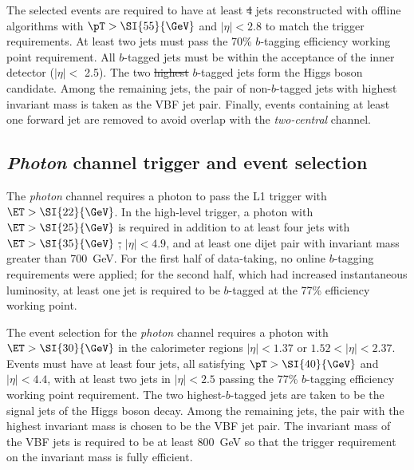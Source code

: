 \documentclass[PAPER, american,coverpage,texlive=2016, english]{\ATLASLATEXPATH atlasdoc}
\providecommand{\DIFadd}[1]{{\protect\color{blue}\uwave{#1}}} %
\providecommand{\DIFdel}[1]{{\protect\color{red}\sout{#1}}}                      %
\providecommand{\DIFaddbegin}{} %
\providecommand{\DIFaddend}{} %
\providecommand{\DIFdelbegin}{} %
\providecommand{\DIFdelend}{} %
\begin{document}
The selected events are required to have at least \DIFdelbegin \DIFdel{4 }\DIFdelend \DIFaddbegin \DIFadd{four }\DIFaddend jets reconstructed with offline algorithms with $\pT > \SI{55}{\GeV}$ and $|\eta|<2.8$ to match the trigger requirements.
At least two jets must pass the 70\% $b$-tagging efficiency working point requirement. 
All $b$-tagged jets must be within the acceptance of the inner detector ($|\eta| < $ 2.5).  The two \DIFdelbegin \DIFdel{highest }\DIFdelend \DIFaddbegin \DIFadd{highest-}\DIFaddend \pT $b$-tagged jets form the Higgs boson candidate.
Among the remaining jets, the pair of non-$b$-tagged jets with highest invariant mass is taken as the VBF jet pair.
Finally, events containing at least one forward jet \DIFaddbegin \DIFadd{with $\pT > 60~\GeV$ }\DIFaddend are removed to avoid overlap with the \textit{two-central} channel.

\subsection{\textit{Photon} channel trigger and event selection}

The \textit{photon} channel requires a photon to pass the L1 trigger with $\ET > \SI{22}{\GeV}$.
In the high-level trigger, a photon with $\ET > \SI{25}{\GeV}$ is required in addition to
 at least four jets with $\ET > \SI{35}{\GeV}$ \DIFdelbegin \DIFdel{, }\DIFdelend \DIFaddbegin \DIFadd{and }\DIFaddend $|\eta|<4.9$, and at least one dijet pair with invariant mass greater than \SI{700}{\GeV}.
For the first half of \DIFaddbegin \DIFadd{the }\DIFaddend data-taking, no online $b$-tagging requirements were applied;
for the second half, which had increased instantaneous luminosity, at least one jet is required to be $b$-tagged at the 77\% efficiency working point.

The event selection for the \textit{photon} channel requires a photon with $\ET > \SI{30}{\GeV}$ in the calorimeter regions $|\eta|<1.37$ or $1.52<|\eta|<2.37$.
Events must have at least four jets, all satisfying $\pT > \SI{40}{\GeV}$ and $|\eta|<4.4$, with at least two jets in $|\eta|<2.5$ passing the 77\% $b$-tagging efficiency working point requirement. 
The two highest-\pT $b$-tagged jets are taken to be the signal jets of the Higgs boson decay.
Among the remaining jets, the pair with the highest invariant mass is chosen to be the VBF jet pair.
The invariant mass of the VBF jets is required to be at least \SI{800}{\GeV} so that the trigger requirement \DIFaddbegin \DIFadd{imposed }\DIFaddend on the invariant mass is fully efficient.
\end{document}
